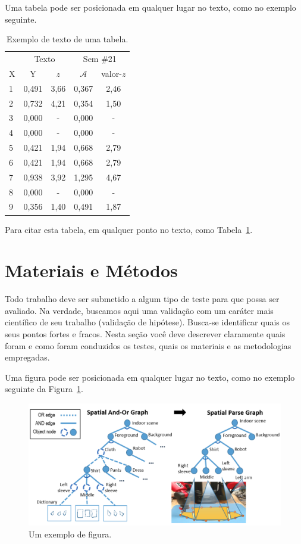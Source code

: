 \documentclass[twoside,conference,a4paper]{IEEEtran}
\begin{document}
Uma tabela pode ser posicionada em qualquer lugar no texto, como no exemplo
seguinte.
%
\begin{table}[ht]
\renewcommand{\arraystretch}{1.3}
\centering
 \caption{Exemplo de texto de uma tabela.}
 \label{tab:tab1}
 \begin{tabular}{lcccc}\hline
  & \multicolumn{2}{c}{Texto}
  & \multicolumn{2}{c}{Sem \#21} \\ \cline{2-5}
  X & Y & $z$ & $\mathcal{A}$ & valor-$z$ \\ \hline \hline
  1      &0,491  & 3,66   &0,367 &2,46  \\
  2    &0,732  & 4,21   &0,354 &1,50  \\
  3      &0,000  & -      &0,000 & -    \\
  4      &0,000  & -      &0,000 & -  \\
  5      &0,421  & 1,94   &0,668 &2,79  \\
  6      &0,421  & 1,94   &0,668 &2,79  \\
  7      &0,938  & 3,92   &1,295 &4,67 \\
  8       &0,000  & -      &0,000 & - \\
  9       &0,356  & 1,40   &0,491 &1,87 \\ \hline
 \end{tabular}
\end{table}

Para citar esta tabela, em qualquer ponto no texto, como Tabela~\ref{tab:tab1}.


\section{Materiais e Métodos}

Todo trabalho deve ser submetido a algum tipo de teste para que possa ser avaliado. Na verdade, buscamos aqui uma validação com um caráter mais científico de seu trabalho (validação de hipótese). Busca-se identificar quais os seus pontos fortes e fracos. Nesta seção você deve descrever claramente quais foram e como foram conduzidos os testes, quais os materiais e as metodologias empregadas.   

Uma figura pode ser posicionada em qualquer lugar no texto, como no exemplo seguinte da Figura~\ref{fig:fig1}.

\begin{figure}[ht]
\centering
\includegraphics[width=1\hsize]{figuras/pipeline.png}
\caption{Um exemplo de figura.}
\label{fig:fig1}
\end{figure}
\end{document}
